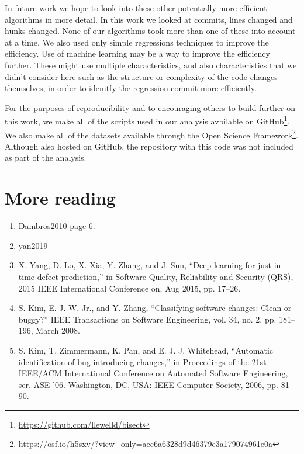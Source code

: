 \documentclass[10pt,journal,compsoc]{IEEEtran}
\begin{document}
In future work we hope to look into these other potentially more efficient algorithms in more detail. In this work we looked at commits, lines changed and hunks changed. None of our algorithms took more than one of these into account at a time. We also used only simple regressions techniques to improve the efficiency. Use of machine learning may be a way to improve the efficiency further. These might use multiple characteristics, and also characteristics that we didn't consider here such as the structure or complexity of the code changes themselves, in order to idenitfy the regression commit more efficiently.

For the purposes of reproducibility and to encouraging others to build further on this work, we make all of the scripts used in our analysis avbilable on GitHub\footnote{\url{https://github.com/llewelld/bisect}}. We also make all of the datasets available through the Open Science Framework\footnote{\url{https://osf.io/h5sxv/?view_only=aec6a6328d9d46379e3a179074961e0a}}. Although also hosted on GitHub, the repository with this code was not included as part of the analysis.

\section{More reading}

\begin{enumerate}
\item Dambros2010 page 6.
\item yan2019
\item X. Yang, D. Lo, X. Xia, Y. Zhang, and J. Sun, “Deep learning for just-in-time defect prediction,” in Software Quality, Reliability and Security (QRS), 2015 IEEE International Conference on, Aug 2015, pp. 17–26.
\item S. Kim, E. J. W. Jr., and Y. Zhang, “Classifying software changes: Clean or buggy?” IEEE Transactions on Software Engineering, vol. 34, no. 2, pp. 181–196, March 2008.
\item S. Kim, T. Zimmermann, K. Pan, and E. J. J. Whitehead, “Automatic identification of bug-introducing changes,” in Proceedings of the 21st IEEE/ACM International Conference on Automated Software Engineering, ser. ASE ’06. Washington, DC, USA: IEEE Computer Society, 2006, pp. 81–90.
\end{enumerate}
\end{document}
